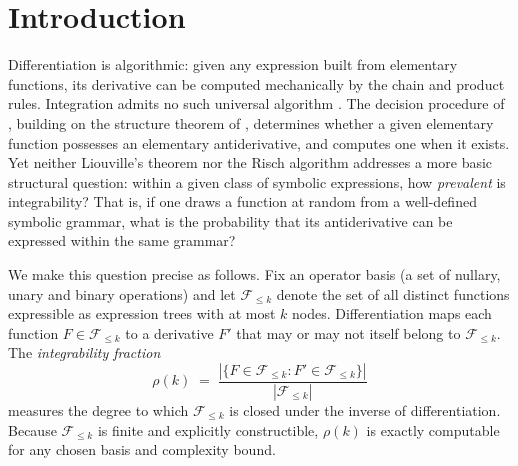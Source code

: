 \documentclass[preprint,12pt,authoryear]{elsarticle}
\newcommand{\Fleq}{\mathcal{F}_{\leq k}}
\newcommand{\rhok}{\rho(k)}
\newcommand{\hd}[1]{{\color{red}\textbf{[HD: #1]}}}
\begin{document}
\section{Introduction}
\label{sec:intro}

Differentiation is algorithmic: given any expression built from elementary
functions, its derivative can be computed mechanically by the chain and product
rules.  Integration admits no such universal algorithm \citep{Bronstein2005}.  The decision procedure
of \citet{Risch1969}, building on the structure theorem of \citet{Liouville1835},
determines whether a given elementary function possesses an elementary
antiderivative, and computes one when it exists.  Yet neither Liouville's
theorem nor the Risch algorithm addresses a more basic structural question:
within a given class of symbolic expressions, how \emph{prevalent} is
integrability?  That is, if one draws a function at random from a well-defined
symbolic grammar, what is the probability that its antiderivative can be
expressed within the same grammar?

We make this question precise as follows.  Fix an operator basis (a set of nullary, unary and binary operations) and let $\Fleq$ denote the set of all distinct functions
expressible as expression trees with at most $k$ nodes.  Differentiation maps each function $F \in \Fleq$ to a derivative $F'$ that may or may not itself belong to $\Fleq$.  The
\emph{integrability fraction}
\begin{equation}\label{eq:1}
	\rhok \;=\; \frac{|\{F \in \Fleq : F' \in \Fleq\}|}{|\Fleq|}	
\end{equation}
measures the degree to which $\Fleq$ is closed under the inverse of
differentiation.  Because $\Fleq$ is finite and explicitly constructible,
$\rhok$ is exactly computable for any chosen basis and complexity bound.
\end{document}
